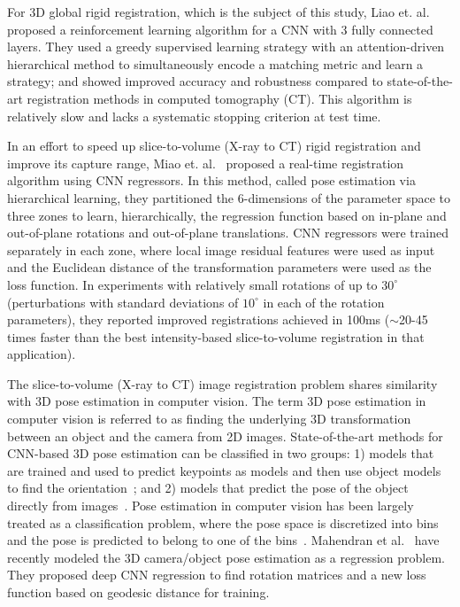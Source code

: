 \documentclass[journal,transmag]{IEEEtran}
\begin{document}
For 3D global rigid registration, which is the subject of this study, Liao et. al.~\cite{liao2017artificial} proposed a reinforcement learning algorithm for a CNN with 3 fully connected layers. They used a greedy supervised learning strategy with an attention-driven hierarchical method to simultaneously encode a matching metric and learn a strategy; and showed improved accuracy and robustness compared to state-of-the-art registration methods in computed tomography (CT). This algorithm is relatively slow and lacks a systematic stopping criterion at test time.

In an effort to speed up slice-to-volume (X-ray to CT) rigid registration and improve its capture range, Miao et. al.~\cite{miao2016real, miao2016cnn} proposed a real-time registration algorithm using CNN regressors. In this method, called pose estimation via hierarchical learning, they partitioned the 6-dimensions of the parameter space to three zones to learn, hierarchically, the regression function based on in-plane and out-of-plane rotations and out-of-plane translations. CNN regressors were trained separately in each zone, where local image residual features were used as input and the Euclidean distance of the transformation parameters were used as the loss function. In experiments with relatively small rotations of up to $30^{\circ}$ (perturbations with standard deviations of $10^{\circ}$ in each of the rotation parameters), they reported improved registrations achieved in 100ms ($\sim$20-45 times faster than the best intensity-based slice-to-volume registration in that application).

The slice-to-volume (X-ray to CT) image registration problem shares similarity with 3D pose estimation in computer vision. The term 3D pose estimation in computer vision is referred to as finding the underlying 3D transformation between an object and the camera from 2D images. State-of-the-art methods for CNN-based 3D pose estimation can be classified in two groups: 1) models that are trained and used to predict keypoints as models and then use object models to find the orientation~\cite{wu2016single, pavlakos20176}; and 2) models that predict the pose of the object directly from images~\cite{tulsiani2015viewpoints, su2015render}. Pose estimation in computer vision has been largely treated as a classification problem, where the pose space is discretized into bins and the pose is predicted to belong to one of the bins~\cite{tulsiani2015viewpoints,su2015render}. Mahendran et al.~\cite{mahendran20173d} have recently modeled the 3D camera/object pose estimation as a regression problem. %
They proposed deep CNN regression to find rotation matrices and a new loss function based on geodesic distance for training.
\end{document}
